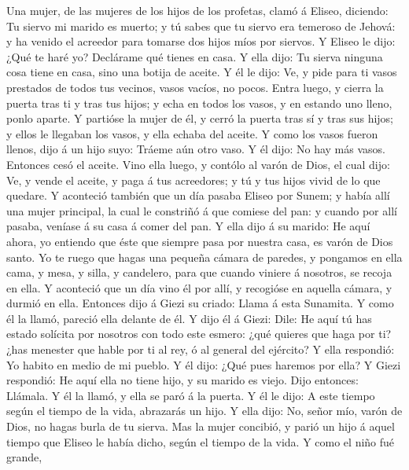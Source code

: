  Una mujer, de las mujeres de los hijos de los profetas,
clamó á Eliseo, diciendo: Tu siervo mi marido es muerto; y tú sabes que
tu siervo era temeroso de Jehová: y ha venido el acreedor para tomarse
dos hijos míos por siervos.  Y Eliseo le dijo: ¿Qué te
haré yo? Declárame qué tienes en casa. Y ella dijo: Tu sierva ninguna
cosa tiene en casa, sino una botija de aceite.  Y él le
dijo: Ve, y pide para ti vasos prestados de todos tus vecinos, vasos
vacíos, no pocos.  Entra luego, y cierra la puerta tras ti
y tras tus hijos; y echa en todos los vasos, y en estando uno lleno,
ponlo aparte.  Y partióse la mujer de él, y cerró la
puerta tras sí y tras sus hijos; y ellos le llegaban los vasos, y ella
echaba del aceite.  Y como los vasos fueron llenos, dijo á
un hijo suyo: Tráeme aún otro vaso. Y él dijo: No hay más vasos.
Entonces cesó el aceite.  Vino ella luego, y contólo al
varón de Dios, el cual dijo: Ve, y vende el aceite, y paga á tus
acreedores; y tú y tus hijos vivid de lo que quedare.  Y
aconteció también que un día pasaba Eliseo por Sunem; y había allí una
mujer principal, la cual le constriñó á que comiese del pan: y cuando
por allí pasaba, veníase á su casa á comer del pan.  Y
ella dijo á su marido: He aquí ahora, yo entiendo que éste que siempre
pasa por nuestra casa, es varón de Dios santo.  Yo te
ruego que hagas una pequeña cámara de paredes, y pongamos en ella cama,
y mesa, y silla, y candelero, para que cuando viniere á nosotros, se
recoja en ella.  Y aconteció que un día vino él por allí,
y recogióse en aquella cámara, y durmió en ella. 
Entonces dijo á Giezi su criado: Llama á esta Sunamita. Y como él la
llamó, pareció ella delante de él.  Y dijo él á Giezi:
Dile: He aquí tú has estado solícita por nosotros con todo este esmero:
¿qué quieres que haga por ti? ¿has menester que hable por ti al rey, ó
al general del ejército? Y ella respondió: Yo habito en medio de mi
pueblo.  Y él dijo: ¿Qué pues haremos por ella? Y Giezi
respondió: He aquí ella no tiene hijo, y su marido es viejo.
 Dijo entonces: Llámala. Y él la llamó, y ella se paró á
la puerta.  Y él le dijo: A este tiempo según el tiempo
de la vida, abrazarás un hijo. Y ella dijo: No, señor mío, varón de
Dios, no hagas burla de tu sierva.  Mas la mujer
concibió, y parió un hijo á aquel tiempo que Eliseo le había dicho,
según el tiempo de la vida.  Y como el niño fué grande,
